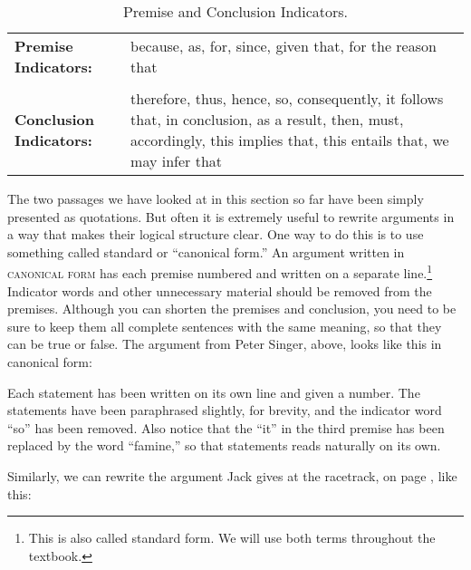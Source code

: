 \begin{table}
\begin{longtabu} to \textwidth {X[4,p]X[8,p]}
\textbf{Premise Indicators:} & because, as, for, since, given that, for the reason that \\
& \\
\textbf{Conclusion Indicators:} & therefore, thus, hence, so, consequently, it follows that, in conclusion, as a result, then, must, accordingly, this implies that, this entails that, we may infer that \\
\end{longtabu}
\caption{Premise and Conclusion Indicators.}
\label{tab:indicators}
\end{table}

The two passages we have looked at in this section so far have been simply presented as quotations. But often it is extremely useful to rewrite arguments in a way that makes their logical structure clear. One way to do this is to use something called standard or ``canonical form.'' An argument written in \textsc{\gls{canonical form}} \label{def:canonical_form} has each premise numbered and written on a separate line.\footnote{This is also called standard form. We will use both terms throughout the textbook.} Indicator words and other unnecessary material should be removed from the premises. Although you can shorten the premises and conclusion, you need to be sure to keep them all complete sentences with the same meaning, so that they can be true or false. The argument from Peter Singer, above, looks like this in canonical form:

\begin{kormanize}
\end{kormanize}

Each statement has been written on its own line and given a number. The statements have been paraphrased slightly, for brevity, and the indicator word ``so'' has been removed. Also notice that the ``it'' in the third premise has been replaced by the word ``famine,'' so that statements reads naturally on its own.

Similarly, we can rewrite the argument Jack gives at the racetrack, on page \pageref{racetrack}, like this:

